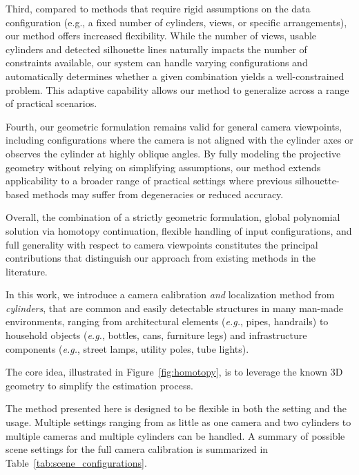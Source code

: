 Third, compared to methods that require rigid assumptions on the data configuration (e.g., a fixed number of cylinders, views, or specific arrangements), our method offers increased flexibility. While the number of views, usable cylinders and detected silhouette lines naturally impacts the number of constraints available, our system can handle varying configurations and automatically determines whether a given combination yields a well-constrained problem. This adaptive capability allows our method to generalize across a range of practical scenarios.

Fourth, our geometric formulation remains valid for general camera viewpoints, including configurations where the camera is not aligned with the cylinder axes or observes the cylinder at highly oblique angles. By fully modeling the projective geometry without relying on simplifying assumptions, our method extends applicability to a broader range of practical settings where previous silhouette-based methods may suffer from degeneracies or reduced accuracy.

Overall, the combination of a strictly geometric formulation, global polynomial solution via homotopy continuation, flexible handling of input configurations, and full generality with respect to camera viewpoints constitutes the principal contributions that distinguish our approach from existing methods in the literature.



In this work, we introduce a camera calibration \emph{and} localization method from \emph{cylinders}, that are common and easily detectable structures in many man-made environments, ranging from architectural elements (\emph{e.g.}, pipes, handrails) to household objects (\emph{e.g.}, bottles, cans, furniture legs) and infrastructure components (\emph{e.g.}, street lamps, utility poles, tube lights).

The core idea, illustrated in Figure~\ref{fig:homotopy}, is to leverage the known 3D geometry to simplify the estimation process.

The method presented here is designed to be flexible in both the setting and the usage. Multiple settings ranging from as little as one camera and two cylinders to multiple cameras and multiple cylinders can be handled. A summary of possible scene settings for the full camera calibration is summarized in Table~\ref{tab:scene_configurations}.


